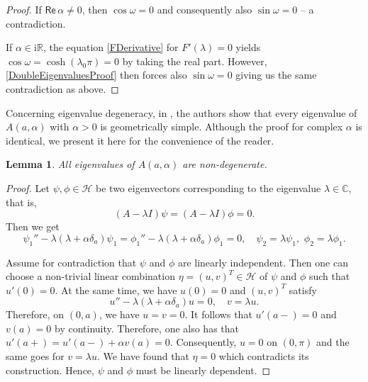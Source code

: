 \documentclass[11pt, a4paper,reqno]{amsart}
\theoremstyle{plain}
\newtheorem{lemma}[theorem]{Lemma}
\theoremstyle{definition}
\theoremstyle{remark}
\newcommand{\1}{\mathds 1}
\renewcommand{\Re}{\mathsf{Re}\,}
\begin{document}
\begin{proof}
    If $\Re \alpha \neq 0$, then $\cos\omega = 0$ and consequently also $\sin\omega = 0$ -- a contradiction.
    
    If $\alpha \in \mathrm{i}\mathbb R$, the equation \eqref{FDerivative} for $F'(\lambda) = 0$ yields $\cos\omega = \cosh(\lambda_0\pi) = 0$ by taking the real part. However, \eqref{DoubleEigenvaluesProof} then forces also $\sin\omega = 0$ giving us the same contradiction as above.
\end{proof}

Concerning eigenvalue degeneracy, in \cite{BRT}, the authors show that every eigenvalue of $A(a, \alpha)$ with $\alpha > 0$ is geometrically simple. Although the proof for complex $\alpha$ is identical, we present it here for the convenience of the reader.

\begin{lemma}
    All eigenvalues of $A(a, \alpha)$ are non-degenerate.
\end{lemma}
\begin{proof}
    Let $\psi, \phi \in \mathcal H$ be two eigenvectors corresponding to the eigenvalue $\lambda \in \mathbb C$, that is,
    \[
    (A-\lambda I)\psi = (A-\lambda I)\phi = 0.
    \]
    Then we get
    \[
    \psi_1'' - \lambda(\lambda + \alpha \delta_a)\psi_1 = \phi_1''-\lambda(\lambda + \alpha\delta_a)\phi_1 = 0, \quad \psi_2 = \lambda \psi_1,\,\,\phi_2 = \lambda\phi_1.
    \]
    
    Assume for contradiction that $\psi$ and $\phi$ are linearly independent. Then one can choose a non-trivial linear combination $\eta = (u,v)^T \in \mathcal H$ of $\psi$ and $\phi$ such that $u'(0) = 0$. At the same time, we have $u(0) = 0$ and $(u,v)^T$ satisfy
    \[
    u'' - \lambda(\lambda + \alpha\delta_a)u = 0, \quad v = \lambda u.
    \]
    Therefore, on $(0, a)$, we have $u = v = 0$. It follows that $u'(a-) = 0$ and $v(a) = 0$ by continuity. Therefore, one also has that $u'(a+) = u'(a-) + \alpha v(a) = 0$. Consequently, $u = 0$ on $(0, \pi)$ and the same goes for $v = \lambda u$. We have found that $\eta = 0$ which contradicts its construction. Hence, $\psi$ and $\phi$ must be linearly dependent.
\end{proof}
\end{document}
